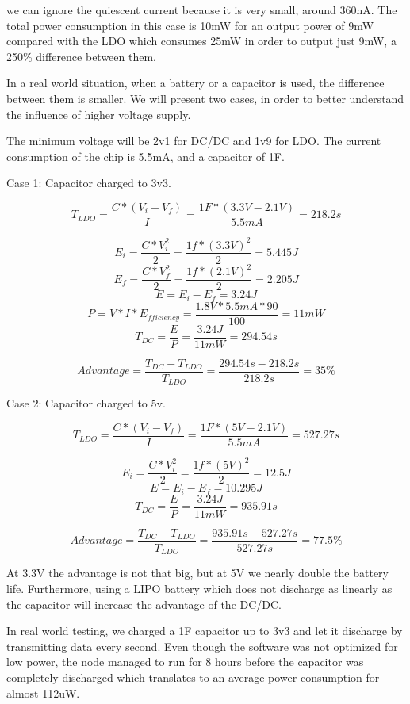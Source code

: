 we can ignore the quiescent current because it is very small, around 360nA. The total power
consumption in this case is 10mW for an output power of 9mW compared with the LDO which consumes
25mW in order to output just 9mW, a 250\% difference between them.

In a real world situation, when a battery or a capacitor is used, the difference between them is
smaller. We will present two cases, in order to better understand the influence of higher
voltage supply.

The minimum voltage will be 2v1 for DC/DC and 1v9 for LDO. The current consumption of the chip is
5.5mA, and a capacitor of 1F.

Case 1: Capacitor charged to 3v3.

$$T_{LDO} = \frac{C * (V_i - V_f)}{I}=\frac{1F * (3.3V - 2.1V)}{5.5mA} = 218.2s $$

$$E_i = \frac{C*V_i^2}{2} = \frac{1f*(3.3V)^2}{2} =5.445J$$
$$E_f = \frac{C*V_f^2}{2} = \frac{1f*(2.1V)^2}{2} =2.205J$$
$$E = E_i - E_f = 3.24J$$
$$P = V*I*E_{fficiency }= \frac{1.8V * 5.5mA * 90}{100} = 11mW$$
$$T_{DC} = \frac{E}{P} = \frac{3.24J}{11mW} =294.54s $$

$$Advantage = \frac{T_{DC} - T_{LDO}}{T_{LDO}} = \frac{294.54s - 218.2s}{218.2s} =  35\%$$

Case 2: Capacitor charged to 5v.

$$T_{LDO} = \frac{C * (V_i - V_f)}{I}=\frac{1F * (5V - 2.1V)}{5.5mA} = 527.27s $$

$$E_i = \frac{C*V_i^2}{2} = \frac{1f*(5V)^2}{2} =12.5J$$
$$E = E_i - E_f = 10.295J$$
$$T_{DC} = \frac{E}{P} = \frac{3.24J}{11mW} =935.91s $$

$$Advantage = \frac{T_{DC} - T_{LDO}}{T_{LDO}} = \frac{935.91s - 527.27s}{527.27s} = 77.5\%$$

At 3.3V the advantage is not that big, but at 5V we nearly double the battery life. Furthermore, using a LIPO
battery which does not discharge as linearly as the capacitor will increase the
advantage of the DC/DC.

In real world testing, we charged a 1F capacitor up to 3v3 and let it discharge by transmitting data every second. Even though the software was not
optimized for low power, the node managed to run for 8 hours before the capacitor was completely
discharged which translates to an average power consumption for almost 112uW.

